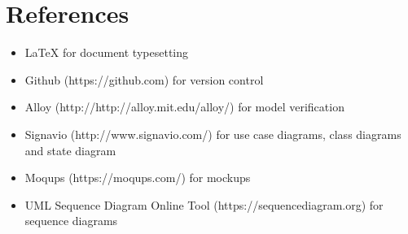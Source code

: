 \chapter{References}
		\begin{itemize}
			\item \LaTeX {  for document typesetting}
			\item Github (https://github.com) for version control
			\item Alloy (http://http://alloy.mit.edu/alloy/) for model verification
			\item Signavio (http://www.signavio.com/) for use case diagrams, class diagrams and state diagram
			\item Moqups (https://moqups.com/) for mockups
			\item UML Sequence Diagram Online Tool (https://sequencediagram.org) for sequence diagrams
		\end{itemize}
					
	